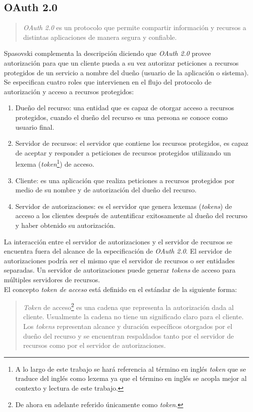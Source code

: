 \subsection{OAuth 2.0}\label{sec:oauth}
\begin{quote}
	\textit{OAuth 2.0} es un protocolo que permite compartir información y recursos a distintas aplicaciones de manera segura y confiable\cite{MasteringOAuth2}.
\end{quote}
Spasovski complementa la descripción diciendo que \textit{OAuth 2.0} provee autorización para que un cliente pueda a su vez autorizar peticiones a recursos protegidos de un servicio a nombre del dueño (usuario de la aplicación o sistema)\cite{OAuth2Identity}.
Se especifican cuatro roles que intervienen en el flujo del protocolo de autorización y acceso a recursos protegidos\cite{OAuthRFC}:
\begin{enumerate}
	\item Dueño del recurso: una entidad que es capaz de otorgar acceso a recursos protegidos, cuando el dueño del recurso es una persona se conoce como usuario final.
	\item Servidor de recursos: el servidor que contiene los recursos protegidos, es capaz de aceptar y responder a peticiones de recursos protegidos utilizando un lexema (\textit{token}\footnote{A lo largo de este trabajo se hará referencia al término en inglés \textit{token} que se traduce del inglés como lexema ya que el término en inglés se acopla mejor al contexto y lectura de este trabajo.}) de acceso.
	\item Cliente: es una aplicación que realiza peticiones a recursos protegidos por medio de su nombre y de autorización del dueño del recurso.
	\item Servidor de autorizaciones: es el servidor que genera lexemas (\textit{tokens}) de acceso a los clientes después de autentificar exitosamente al dueño del recurso y haber obtenido su autorización.
\end{enumerate}
La interacción entre el servidor de autorizaciones y el servidor de recursos se encuentra fuera del alcance de la especificación de \textit{OAuth 2.0}. El servidor de autorizaciones podría ser el mismo que el servidor de recursos o ser entidades separadas. Un servidor de autorizaciones puede generar \textit{tokens} de acceso para múltiples servidores de recursos\cite{OAuthRFC}.\\
El concepto \textit{token de acceso} está definido en el estándar de la siguiente forma\cite{OAuthRFC}:
\begin{quote}
	\textit{Token} de acceso\footnote{De ahora en adelante referido únicamente como \textit{token}.} es una cadena que representa la autorización dada al cliente. Usualmente la cadena no tiene un significado claro para el cliente. Los \textit{tokens} representan alcance y duración específicos otorgados por el dueño del recurso y se encuentran respaldados tanto por el servidor de recursos como por el servidor de autorizaciones.
\end{quote}

